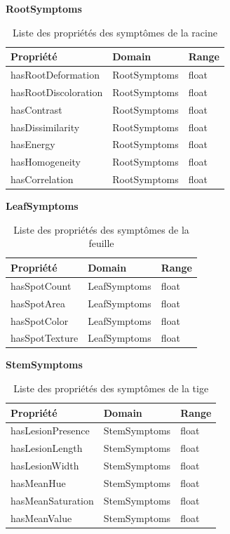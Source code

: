 \documentclass{article}
\begin{document}
	\FloatBarrier
	
	\noindent\textbf{RootSymptoms}
	\begin{table}[H]
		\centering
		\begin{tabular}{|p{5cm}|p{5cm}|p{5cm}|}
			\hline
			\textbf{Propriété} & \textbf{Domain} & \textbf{Range} \\
			\hline
			hasRootDeformation & RootSymptoms & float \\
			\hline
			hasRootDiscoloration & RootSymptoms & float \\
			\hline
			hasContrast & RootSymptoms & float \\
			\hline
			hasDissimilarity & RootSymptoms & float \\
			\hline
			hasEnergy & RootSymptoms & float \\
			\hline
			hasHomogeneity & RootSymptoms & float \\
			\hline
			hasCorrelation & RootSymptoms & float \\
			\hline
		\end{tabular}
		\caption{Liste des propriétés des symptômes de la racine}
	\end{table}
	
	\FloatBarrier
	
	\noindent\textbf{LeafSymptoms}
	\begin{table}[H]
		\centering
		\begin{tabular}{|p{5cm}|p{5cm}|p{5cm}|}
			\hline
			\textbf{Propriété} & \textbf{Domain} & \textbf{Range} \\
			\hline
			hasSpotCount & LeafSymptoms & float \\
			\hline
			hasSpotArea & LeafSymptoms & float \\
			\hline
			hasSpotColor & LeafSymptoms & float \\
			\hline
			hasSpotTexture & LeafSymptoms & float \\
			\hline
		\end{tabular}
		\caption{Liste des propriétés des symptômes de la feuille}
	\end{table}
	
	\FloatBarrier
	
	\noindent\textbf{StemSymptoms}
	\begin{table}[H]
		\centering
		\begin{tabular}{|p{5cm}|p{5cm}|p{5cm}|}
			\hline
			\textbf{Propriété} & \textbf{Domain} & \textbf{Range} \\
			\hline
			hasLesionPresence & StemSymptoms & float \\
			\hline
			hasLesionLength & StemSymptoms & float \\
			\hline
			hasLesionWidth & StemSymptoms & float \\
			\hline
			hasMeanHue & StemSymptoms & float \\
			\hline
			hasMeanSaturation & StemSymptoms & float \\
			\hline
			hasMeanValue & StemSymptoms & float \\
			\hline
		\end{tabular}
		\caption{Liste des propriétés des symptômes de la tige}
	\end{table}
	
\end{document}
